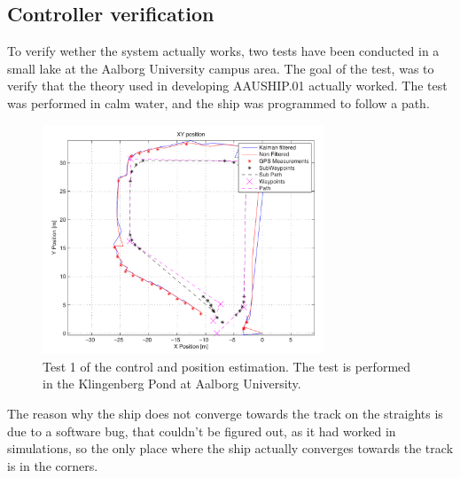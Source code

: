 \documentclass{ifacconf}
\begin{document}
\subsection{Controller verification}
To verify wether the system actually works, two tests have been conducted in a small lake at the Aalborg University campus area. The goal of the test, was to verify that the theory used in developing AAUSHIP.01 actually worked. The test was performed in calm water, and the ship was programmed to follow a path.  
\begin{figure}
	\begin{center}
		\includegraphics[width=8.4cm]{img/position}    %
		\caption{Test 1 of the control and position estimation. The test is performed in the Klingenberg Pond at Aalborg University.}
		\label{fig:position}               
	\end{center}                                 %
\end{figure}
The reason why the ship does not converge towards the track on the straights is due to a software bug, that couldn't be figured out, as it had worked in simulations, so the only place where the ship actually converges towards the track is in the corners.
\end{document}
